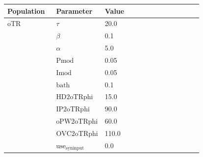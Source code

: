 \documentclass{article}
\begin{document}
\noindent
\begin{tabularx}{\linewidth}{|p{0.25\linewidth}|p{0.25\linewidth}|X|}\hline
\textbf{Population} & \textbf{Parameter} & \textbf{Value}   \\ \hline

    oTR             & $\tau$        & 20.0  \\ \hline

                 & $\beta$        & 0.1  \\ \hline

                 & $\alpha$        & 5.0  \\ \hline

                 & ${\text{Pmod}}$        & 0.05  \\ \hline

                 & ${\text{Imod}}$        & 0.05  \\ \hline

                 & ${\text{bath}}$        & 0.1  \\ \hline

                 & ${\text{HD2oTRphi}}$        & 15.0  \\ \hline

                 & ${\text{IP2oTRphi}}$        & 90.0  \\ \hline

                 & ${\text{oPW2oTRphi}}$        & 60.0  \\ \hline

                 & ${\text{OVC2oTRphi}}$        & 110.0  \\ \hline

                 & ${\text{use}}_{\text{syninput}}$        & 0.0  \\ \hline

\end{tabularx}
\end{document}
